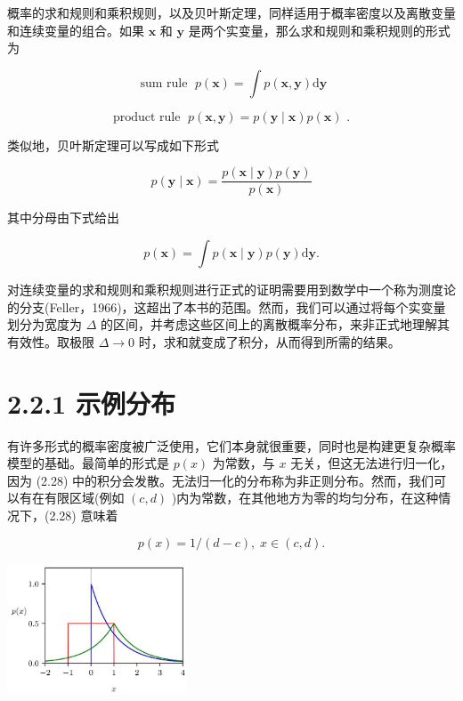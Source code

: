 \documentclass[10pt]{article}
\begin{document}
概率的求和规则和乘积规则，以及贝叶斯定理，同样适用于概率密度以及离散变量和连续变量的组合。如果 \(\mathbf{x}\) 和 \(\mathbf{y}\) 是两个实变量，那么求和规则和乘积规则的形式为

\[
\text{ sum rule }\;p\left( \mathbf{x}\right)  = \int p\left( {\mathbf{x},\mathbf{y}}\right) \mathrm{d}\mathbf{y} \tag{2.29}
\]

\[
\text{ product rule }\;p\left( {\mathbf{x},\mathbf{y}}\right)  = p\left( {\mathbf{y} \mid  \mathbf{x}}\right) p\left( \mathbf{x}\right) \text{ . } \tag{2.30}
\]

类似地，贝叶斯定理可以写成如下形式

\[
p\left( {\mathbf{y} \mid  \mathbf{x}}\right)  = \frac{p\left( {\mathbf{x} \mid  \mathbf{y}}\right) p\left( \mathbf{y}\right) }{p\left( \mathbf{x}\right) } \tag{2.31}
\]

其中分母由下式给出

\[
p\left( \mathbf{x}\right)  = \int p\left( {\mathbf{x} \mid  \mathbf{y}}\right) p\left( \mathbf{y}\right) \mathrm{d}\mathbf{y}. \tag{2.32}
\]

对连续变量的求和规则和乘积规则进行正式的证明需要用到数学中一个称为测度论的分支(Feller，1966)，这超出了本书的范围。然而，我们可以通过将每个实变量划分为宽度为 \(\Delta\) 的区间，并考虑这些区间上的离散概率分布，来非正式地理解其有效性。取极限 \(\Delta  \rightarrow  0\) 时，求和就变成了积分，从而得到所需的结果。

\section*{2.2.1 示例分布}

有许多形式的概率密度被广泛使用，它们本身就很重要，同时也是构建更复杂概率模型的基础。最简单的形式是 \(p\left( x\right)\) 为常数，与 \(x\) 无关，但这无法进行归一化，因为 (2.28) 中的积分会发散。无法归一化的分布称为非正则分布。然而，我们可以有在有限区域(例如 \(\left( {c,d}\right)\) )内为常数，在其他地方为零的均匀分布，在这种情况下，(2.28) 意味着

\[
p\left( x\right)  = 1/\left( {d - c}\right) ,\;x \in  \left( {c,d}\right) . \tag{2.33}
\]

\begin{center}
\includegraphics[max width=0.4\textwidth]{images/0194e279-9b28-703a-88f4-c3ac21e2010d_53_944_343_607_443_0.jpg}
\end{center}
\hspace*{3em} 
\end{document}
